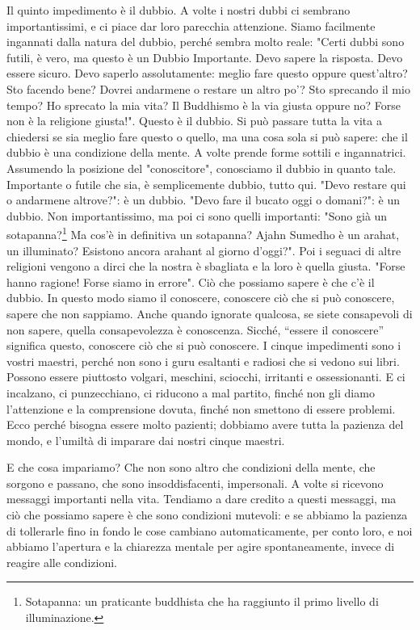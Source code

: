 Il quinto impedimento è il dubbio. A volte i nostri dubbi ci sembrano
importantissimi, e ci piace dar loro parecchia attenzione. Siamo
facilmente ingannati dalla natura del dubbio, perché sembra molto reale:
"Certi dubbi sono futili, è vero, ma questo è un Dubbio Importante. Devo
sapere la risposta. Devo essere sicuro. Devo saperlo assolutamente:
meglio fare questo oppure quest'altro? Sto facendo bene? Dovrei
andarmene o restare un altro po'? Sto sprecando il mio tempo? Ho
sprecato la mia vita? Il Buddhismo è la via giusta oppure no? Forse non
è la religione giusta!". Questo è il dubbio. Si può passare tutta la
vita a chiedersi se sia meglio fare questo o quello, ma una cosa sola si
può sapere: che il dubbio è una condizione della mente. A volte prende
forme sottili e ingannatrici. Assumendo la posizione del "conoscitore",
conosciamo il dubbio in quanto tale. Importante o futile che sia, è
semplicemente dubbio, tutto qui. "Devo restare qui o andarmene
altrove?": è un dubbio. "Devo fare il bucato oggi o domani?": è un
dubbio. Non importantissimo, ma poi ci sono quelli importanti: "Sono già
un sotapanna?\footnote{Sotapanna: un praticante buddhista che ha raggiunto il
primo livello di illuminazione.} Ma cos'è in definitiva un sotapanna? Ajahn
Sumedho è un arahat, un illuminato? Esistono ancora arahant al giorno
d'oggi?". Poi i seguaci di altre religioni vengono a dirci che la nostra
è sbagliata e la loro è quella giusta. "Forse hanno ragione! Forse siamo
in errore". Ciò che possiamo sapere è che c'è il dubbio. In questo modo
siamo il conoscere, conoscere ciò che si può conoscere, sapere che non
sappiamo. Anche quando ignorate qualcosa, se siete consapevoli di non
sapere, quella consapevolezza è conoscenza.
Sicché, “essere il conoscere” significa questo, conoscere ciò che si può
conoscere. I cinque impedimenti sono i vostri maestri, perché non sono i
guru esaltanti e radiosi che si vedono sui libri. Possono essere
piuttosto volgari, meschini, sciocchi, irritanti e ossessionanti. E ci
incalzano, ci punzecchiano, ci riducono a mal partito, finché non gli
diamo l'attenzione e la comprensione dovuta, finché non smettono di
essere problemi. Ecco perché bisogna essere molto pazienti; dobbiamo
avere tutta la pazienza del mondo, e l'umiltà di imparare dai nostri
cinque maestri.

E che cosa impariamo? Che non sono altro che condizioni della mente, che
sorgono e passano, che sono insoddisfacenti, impersonali. A volte si
ricevono messaggi importanti nella vita. Tendiamo a dare credito a
questi messaggi, ma ciò che possiamo sapere è che sono condizioni
mutevoli: e se abbiamo la pazienza di tollerarle fino in fondo le cose
cambiano automaticamente, per conto loro, e noi abbiamo l'apertura e la
chiarezza mentale per agire spontaneamente, invece di reagire alle
condizioni.

